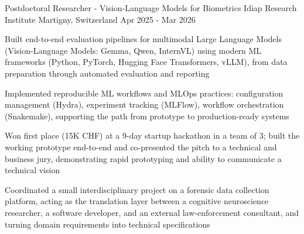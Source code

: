 

\begin{cventries}

\cventry
    {Postdoctoral Researcher - Vision-Language Models for Biometrics} %
    {Idiap Research Institute} %
    {Martigny, Switzerland} %
    {Apr 2025 - Mar 2026} %
    {
      \begin{cvitems} %
        \item {Built end-to-end evaluation pipelines for multimodal Large Language Models (Vision-Language Models: Gemma, Qwen, InternVL) using modern ML frameworks (Python, PyTorch, Hugging Face Transformers, vLLM), from data preparation through automated evaluation and reporting}
        \item {Implemented reproducible ML workflows and MLOps practices: configuration management (Hydra), experiment tracking (MLFlow), workflow orchestration (Snakemake), supporting the path from prototype to production-ready systems}        %
        \item {Won first place (15K CHF) at a 9-day startup hackathon in a team of 3; built the working prototype end-to-end and co-presented the pitch to a technical and business jury, demonstrating rapid prototyping and ability to communicate a technical vision} 
       \item {Coordinated a small interdisciplinary project on a forensic data collection platform, acting as the translation layer between a cognitive neuroscience researcher, a software developer, and an external law-enforcement consultant, and turning domain requirements into technical specifications}
      \end{cvitems}
    }


\end{cventries}

